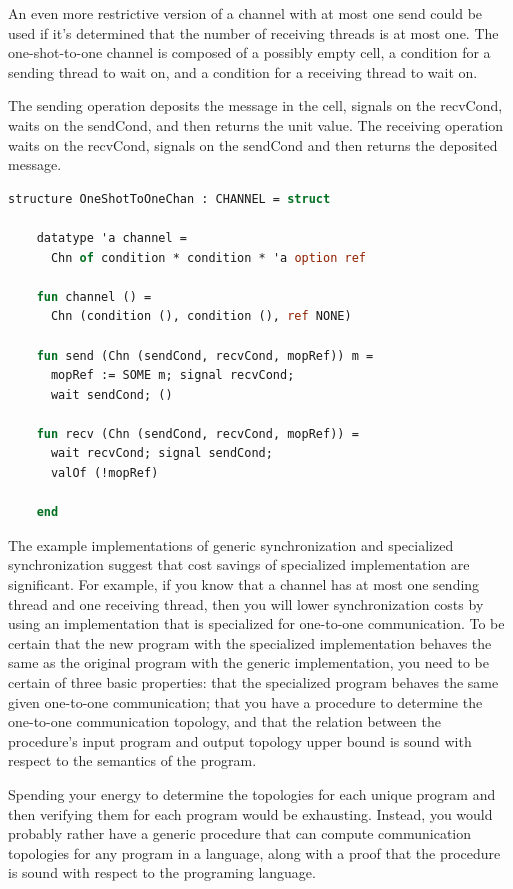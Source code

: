 \documentclass[10pt]{article}
\begin{document}
An even more restrictive version of a channel with at most one send could be used if it's
determined that the number of receiving threads is at most one.  The one-shot-to-one channel is
composed of a possibly empty cell, a condition for a sending thread to wait on, and a condition
for a receiving thread to wait on.

The sending operation deposits the message in the cell, signals on the recvCond, waits on the
sendCond, and then returns the unit value.  The receiving operation waits on the recvCond,
signals on the sendCond and then returns the deposited message.


\begin{lstlisting}[language=ML, mathescape]
  structure OneShotToOneChan : CHANNEL = struct

    datatype 'a channel =
      Chn of condition * condition * 'a option ref

    fun channel () =
      Chn (condition (), condition (), ref NONE)

    fun send (Chn (sendCond, recvCond, mopRef)) m =
      mopRef := SOME m; signal recvCond;  
      wait sendCond; ()

    fun recv (Chn (sendCond, recvCond, mopRef)) =
      wait recvCond; signal sendCond;
      valOf (!mopRef)

    end
  \end{lstlisting}

The example implementations of generic synchronization and specialized synchronization suggest
that cost savings of specialized implementation are significant. For example, if you know that
a channel has at most one sending thread and one receiving thread, then you will
lower synchronization costs by
using an implementation that is specialized for one-to-one communication.  To be certain that
the new program with the specialized implementation behaves the same as the original program
with the generic implementation, you need to be certain of three basic properties: that the
specialized program behaves the same given one-to-one communication; that you have a procedure
to determine the one-to-one communication topology, and that the relation between the
procedure's input program and output topology upper bound is sound with respect to the
semantics of the program.  

Spending your energy to determine the topologies for each unique program and then verifying
them for each program would be exhausting. Instead, you would probably rather have a generic
procedure that can compute communication topologies for any program in a language, along with
a proof that the procedure is sound with respect to the programing language.
\end{document}
